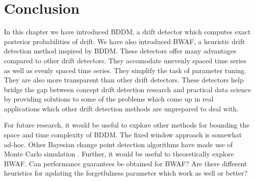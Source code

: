 
\section{Conclusion} \label{BDD:conclusion}

In this chapter we have introduced BDDM, a drift detector which computes exact posterior probabilities of drift. We have also introduced BWAF, a heuristic drift detection method inspired by BDDM. These detectors offer many advantages compared to other drift detectors. They accomodate unevenly spaced time series as well as evenly spaced time series. They simplify the task of parameter tuning. They are also more transparent than other drift detectors. These detectors help bridge the gap between concept drift detection research and practical data science by providing solutions to some of the problems which come up in real applications which other drift detection methods are unprepared to deal with.

For future research, it would be useful to explore other methods for bounding the space and time complexity of BDDM. The fixed window approach is somewhat ad-hoc. Other Bayesian change point detection algorithms have made use of Monte Carlo simulation \cite{BCMC}. Further, it would be useful to theoretically explore BWAF. Can performance guarantees be obtained for BWAF? Are there different heuristics for updating the forgetfulness parameter which work as well or better?